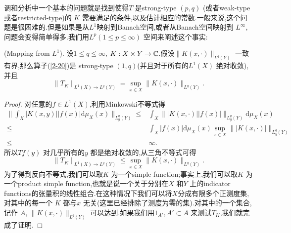  调和分析中一个基本的问题就是找到使得$T$ 是strong-type $(p,q)$ (或者weak-type或者restricted-type)的 $K$ 需要满足的条件,以及估计相应的常数.一般来说,这个问题是很困难的.但是如果是从$L^{1}$映射到Banach空间,或者从Banach空间映射到 $L^{\infty}$,问题会变得简单得多.我们用$L^{p}\left( 1\le p\le \infty \right) $ 空间来阐述这个事实:
 \begin{proposition}\label{prp2-5}
   (Mapping from $L^{1}$). 设$1\le q\le \infty$, $K:X\times Y\to \mathbb{C}$.假设$\|K(x,\cdot )\|_{L^{q}(Y)}$ 一致有界,那么算子{\normalfont (\ref{2-20})}是 strong-type $(1,q)$(并且对于所有的$L^{1}(X)$ 绝对收敛),并且
   \begin{equation}
     \|T_K\|_{L^{1}(X)\to L^{q}(Y)}=\sup_{x\in X}\|K(x,\cdot )\|_{L^{q}(Y)}.
   \end{equation}
 \end{proposition}
 \begin{proof}
   对任意的$f\in L^{1}(X)$,利用Minkowski不等式得
   \begin{align*}
     \|\int_{X}|K(x,y)| |f(x)|\mathrm{d}\mu_X(x)\|_{L^{q}_y(Y)}\le & \int_{X}\| |K(x,\cdot )| |f(x)|\|_{L^{q}_y(Y)}\mathrm{d}\mu_X(x)\\
     \le  & \int_{X}|f(x)| \mathrm{d}\mu_X(x)\sup_{x\in X}\| |K(x,\cdot )|\|_{L^{q}_y(Y)}\\
     \le  & \infty
   .\end{align*}
   所以$Tf(y)$ 对几乎所有的$y$ 都是绝对收敛的,从三角不等式可得
   \[
     \|T_K\|_{L^{1}(X)\to L^{q}(Y)}\le \sup_{x\in X}\|K(x,\cdot )\|_{L^{q}(Y)}.
   \] 
   为了得到反向不等式,我们可以取$K$ 为一个simple function;事实上,我们可以取$K$ 为一个product simple function,也就是说一个关于分别在$X$ 和$Y$ 上的indicator functions的张量积的线性组合.在这种情况下我们可以将$X$分成有限多个正测度集,对其中的每一个 $K$ 都与$x$ 无关(这里已经排除了测度为零的集).对其中的一个集合,记作 $A$,  $\|K(x,\cdot )\|_{L^{q}(Y)}$ 可以达到.如果我们用$1_{A'},A' \subset A$ 来测试$T_K$,我们就完成了证明.
 \end{proof}


